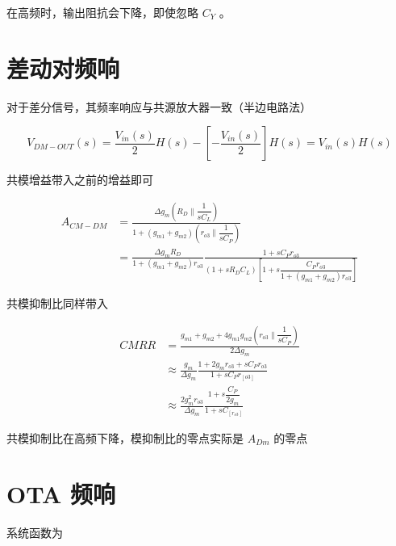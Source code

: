 \documentclass[cn,11pt,chinese,black,simple]{../elegantbook}
\begin{document}
在高频时，输出阻抗会下降，即使忽略 \(C_Y\) 。



\section{差动对频响}

对于差分信号，其频率响应与共源放大器一致（半边电路法）

\[V_{DM-OUT}(s) = \frac{V_{in}(s)}{2} H(s) - \left[-\frac{V_{in}(s)}{2}\right] H(s) = V_{in} (s) H(s)\]


共模增益带入之前的增益即可 

\begin{equation*}
    \begin{aligned}
        A_{CM-DM} &= \frac{\Delta g_m (R_D \| \dfrac{1}{s C_L}) }{1 + (g_{m1} + g_{m2})\left(r_{o3} \| \dfrac{1}{s C_P}\right)} \\
        &= \frac{\Delta g_m R_D}{1 + (g_{m1} + g_{m2})r_{o3}} \frac{1 + s C_P r_{o3}}{(1 + s R_D C_L)\left[1 + s \dfrac{C_P r_{o3}}{1 + (g_{m1} + g_{m2})r_{o3}}\right]}
    \end{aligned}
\end{equation*}

共模抑制比同样带入

\begin{equation*}
    \begin{aligned}
        CMRR &= \frac{g_{m1} + g_{m2} + 4 g_{m1} g_{m2} (r_{o3} \| \dfrac{1}{s C_P})}{2 \Delta g_m} \\
        &\approx \frac{g_m}{\Delta g_m} \frac{1 + 2 g_m r_{o3} + s C_P r_{o3}}{1 + s C_P r_[o3]} \\
        &\approx \frac{2 g_m^2 r_{o3}}{\Delta g_m } \frac{1 + s \dfrac{C_P}{2 g_m}}{1 + s C_[ r_{o3}]} 
    \end{aligned}
\end{equation*}

共模抑制比在高频下降，模抑制比的零点实际是 \(A_{Dm}\) 的零点



\section{OTA 频响}


系统函数为
\end{document}
